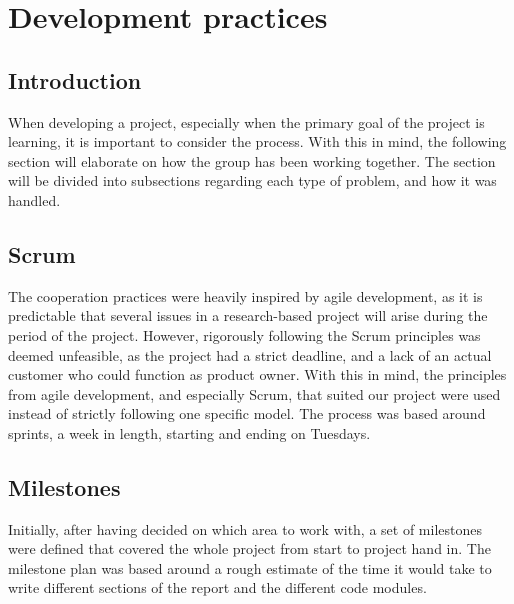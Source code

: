 \section{Development practices}
\subsection{Introduction}
When developing a project, especially when the primary goal of the project is learning, it is important to consider the process.
With this in mind, the following section will elaborate on how the group has been working together.
The section will be divided into subsections regarding each type of problem, and how it was handled.

\subsection{Scrum}
The cooperation practices were heavily inspired by agile development, as it is predictable that several issues in a research-based project will arise during the period of the project.
However, rigorously following the Scrum principles was deemed unfeasible, as the project had a strict deadline, and a lack of an actual customer who could function as product owner.
With this in mind, the principles from agile development, and especially Scrum, that suited our project were used instead of strictly following one specific model.
The process was based around sprints, a week in length, starting and ending on Tuesdays.

\subsection{Milestones}
Initially, after having decided on which area to work with, a set of milestones were defined that covered the whole project from start to project hand in.
The milestone plan was based around a rough estimate of the time it would take to write different sections of the report and the different code modules.

